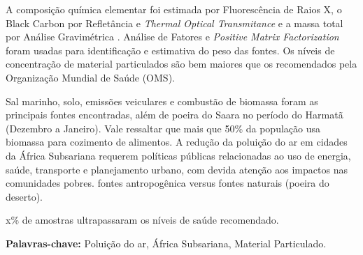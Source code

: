 

 A composição química elementar foi estimada por Fluorescência de 
Raios X, o Black Carbon por Refletância e \textit{Thermal Optical Transmitance} e a massa total por Análise 
Gravimétrica%
. Análise de Fatores e \textit{Positive Matrix Factorization} foram usadas para identificação e 
estimativa do peso das fontes. Os níveis de concentração de material particulados são bem maiores que os 
recomendados pela Organização Mundial de Saúde (OMS).%
 
Sal marinho, solo, emissões veiculares e combustão de biomassa foram as principais fontes encontradas, além 
de poeira do Saara no período do Harmatã (Dezembro a Janeiro). Vale ressaltar que mais que 50\% da população 
usa biomassa para cozimento de alimentos. A redução da poluição do ar em cidades da África Subsariana requerem 
políticas públicas relacionadas ao uso de energia, saúde, transporte e planejamento urbano, com devida atenção 
aos impactos nas comunidades pobres.
fontes antropogênica versus fontes naturais (poeira do deserto).

x\% de amostras ultrapassaram os níveis de saúde recomendado.


\par
\vspace{1em}
\noindent\textbf{Palavras-chave:}  Poluição do ar, África Subsariana, Material Particulado.
\newpage
